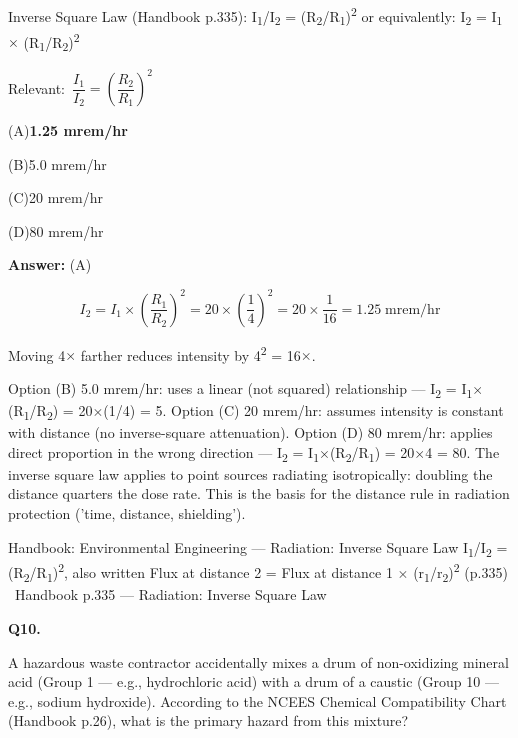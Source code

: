 \documentclass[11pt]{article}
\newcommand{\correct}[1]{\textbf{#1}\;{\color{accent}$\checkmark$}}
\newcommand{\optline}[2]{\par\noindent\hspace{1.2em}(#1)\hspace{0.6em}#2}
\begin{document}
Inverse Square Law (Handbook p.335):
I\textsubscript{1}/I\textsubscript{2} = (R\textsubscript{2}/R\textsubscript{1})\textsuperscript{2}
or equivalently: I\textsubscript{2} = I\textsubscript{1} $\times$ (R\textsubscript{1}/R\textsubscript{2})\textsuperscript{2}\par\vspace{3pt}
{\small\color{soft}Relevant:}\ $\dfrac{I_1}{I_2} = \left(\dfrac{R_2}{R_1}\right)^2$\par\vspace{3pt}
\optline{A}{\correct{1.25 mrem/hr}}
\optline{B}{5.0 mrem/hr}
\optline{C}{20 mrem/hr}
\optline{D}{80 mrem/hr}
\par\vspace{3pt}
\vspace{2pt}\par\noindent\colorbox{boxbg}{\parbox{\dimexpr\linewidth-2\fboxsep\relax}{%
\vspace{2pt}\textbf{Answer:} (A)\par\vspace{2pt}
{\small \[I_2 = I_1 \times \left(\frac{R_1}{R_2}\right)^2 = 20 \times \left(\frac{1}{4}\right)^2 = 20 \times \frac{1}{16} = 1.25\;\text{mrem/hr}\]

Moving 4$\times$ farther reduces intensity by 4\textsuperscript{2} = 16$\times$.

Option (B) 5.0 mrem/hr: uses a linear (not squared) relationship --- I\textsubscript{2} = I\textsubscript{1}$\times$(R\textsubscript{1}/R\textsubscript{2}) = 20$\times$(1/4) = 5. Option (C) 20 mrem/hr: assumes intensity is constant with distance (no inverse-square attenuation). Option (D) 80 mrem/hr: applies direct proportion in the wrong direction --- I\textsubscript{2} = I\textsubscript{1}$\times$(R\textsubscript{2}/R\textsubscript{1}) = 20$\times$4 = 80. The inverse square law applies to point sources radiating isotropically: doubling the distance quarters the dose rate. This is the basis for the distance rule in radiation protection ('time, distance, shielding').}\par\vspace{2pt}
{\footnotesize\color{soft}Handbook: Environmental Engineering --- Radiation: Inverse Square Law I\textsubscript{1}/I\textsubscript{2} = (R\textsubscript{2}/R\textsubscript{1})\textsuperscript{2}, also written Flux at distance 2 = Flux at distance 1 $\times$ (r\textsubscript{1}/r\textsubscript{2})\textsuperscript{2} (p.335) \textbullet\ Handbook p.335 --- Radiation: Inverse Square Law}\vspace{2pt}
}}
\vspace{9pt}
\filbreak
\textbf{\color{accent}Q10.}\par\vspace{2pt}
A hazardous waste contractor accidentally mixes a drum of non-oxidizing mineral acid (Group 1 --- e.g., hydrochloric acid) with a drum of a caustic (Group 10 --- e.g., sodium hydroxide). According to the NCEES Chemical Compatibility Chart (Handbook p.26), what is the primary hazard from this mixture?
\end{document}
